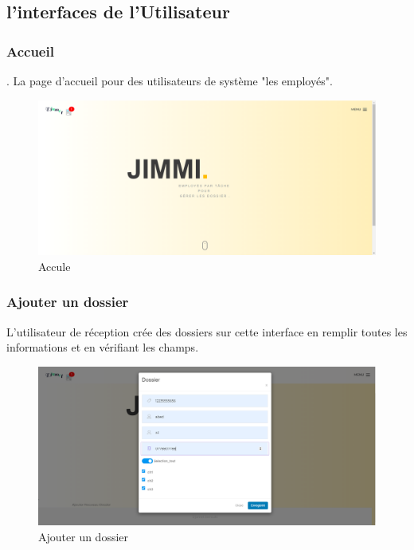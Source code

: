  

 \subsection{l'interfaces de l'Utilisateur }
\subsubsection{ Accueil  }.
La page d'accueil pour des utilisateurs de système "les employés".
\begin{figure}
	\centering
	\includegraphics[width=1\linewidth]{images/captures/capturesuser/home}
	\caption{Accule}
	\label{fig:home}
\end{figure} 




\subsubsection{Ajouter un dossier}

L'utilisateur de réception crée des dossiers sur cette interface en remplir toutes les informations et en vérifiant les champs.
\begin{figure}[H]
	\centering
	\includegraphics[width=1\linewidth]{images/captures/capturesuser/adddossier}
	\caption{Ajouter un dossier}
	\label{fig:adddossier}
\end{figure}



